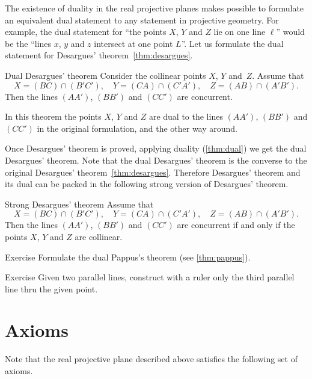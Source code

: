 The existence of duality in the real projective planes makes possible to formulate an equivalent dual statement to any statement in projective geometry.
For example, the dual statement for ``the points $X$, $Y$ and $Z$ lie on one line $\ell$''
would be the ``lines $x$, $y$ and $z$ intersect at one point $L$''.
Let us formulate the dual statement for Desargues' theorem~\ref{thm:desargues}.


\begin{thm}{Dual Desargues' theorem}\label{thm:dual-desargues}
Consider the collinear points $X$, $Y$ and~$Z$.
Assume that 
\[X=(BC)\cap (B'C'),\quad Y=(CA)\cap (C'A'),\quad Z=(AB)\cap (A'B').\]
Then the lines  $(AA')$, $(BB')$ and $(CC')$ are concurrent.
\end{thm}

In this theorem the points $X$, $Y$ and $Z$ 
are dual to the lines $(AA')$, $(BB')$ and $(CC')$ in the original formulation, and the other way around.

Once Desargues' theorem is proved, applying duality (\ref{thm:dual})
we get the dual Desargues' theorem.
Note that the dual Desargues' theorem is the converse to the original Desargues' theorem~\ref{thm:desargues}.
Therefore Desargues' theorem and its dual can be packed in the
following strong version of Desargues' theorem.

\begin{thm}{Strong Desargues' theorem}
Assume that 
\[X=(BC)\cap (B'C'),\quad Y=(CA)\cap (C'A'),\quad Z=(AB)\cap (A'B').\]
Then the lines  $(AA')$, $(BB')$ and $(CC')$ are concurrent if and only if the  points $X$, $Y$ and $Z$ are collinear.
\end{thm}


\begin{thm}{Exercise}\label{ex:dual-pappus}
Formulate the dual Pappus's theorem (see \ref{thm:pappus}).
\end{thm}

\begin{thm}{Exercise}\label{ex:dual-desargues-construction}
Given two parallel lines, construct with a ruler only the third parallel line thru the given point.
\end{thm}

\section*{Axioms}

Note that the real projective plane described above satisfies the following set of axioms.

